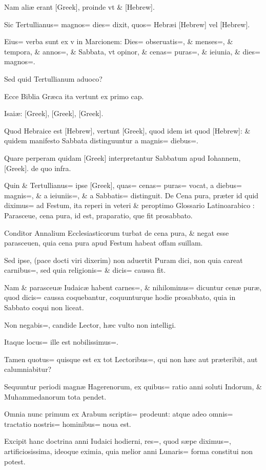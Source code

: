 \begin{parnumbers}
Nam aliæ erant [Greek], proinde vt \& [Hebrew].

Sic Tertullianus= magnos= dies= dixit, quos= Hebræi [Hebrew] vel [Hebrew].

Eius= verba sunt ex v in Marcionem: Dies= obseruatis=, \& menses=, \& tempora, \& annos=, \& Sabbata, vt opinor, \& cenas= puras=, \& ieiunia, \& dies= magnos=. 

Sed quid Tertullianum aduoco?

Ecce Biblia Græca ita vertunt ex primo cap.

Isaiæ: [Greek], [Greek], [Greek].

Quod Hebraice est [Hebrew], vertunt [Greek], quod idem ist quod [Hebrew]: \& quidem manifesto Sabbata distinguuntur a magnis= diebus=. 

Quare perperam quidam [Greek] interpretantur Sabbatum apud Iohannem, [Greek]. de quo infra.

Quin \& Tertullianus= ipse [Greek], quas= cenas= puras= vocat, a diebus= magnis=, \& a ieiuniis=, \& a Sabbatis= distinguit. De Cena pura, præter id quid diximus= ad Festum, ita reperi in veteri \& peroptimo Glossario Latinoarabico : Parasceue, cena pura, id est, praparatio, que fit prosabbato.

Conditor Annalium Ecclesiasticorum turbat de cena pura, \& negat esse parasceuen, quia cena pura apud Festum habeat offam suillam.

Sed ipse, (pace docti viri dixerim) non aduertit Puram dici, non quia careat carnibus=, sed quia religionis= \& dicis= caussa fit.

Nam \& parasceuæ Iudaicæ habent carnes=, \& nihilominus= dicuntur cenæ puræ, quod dicis= caussa coquebantur, coquunturque hodie prosabbato, quia in Sabbato coqui non liceat.

Non negabis=, candide Lector, hæc vulto non intelligi.

Itaque locus= ille est nobilissimus=. 

Tamen quotus= quisque est ex tot Lectoribus=, qui non hæc aut præteribit, aut calumniabitur?

Sequuntur periodi magnæ Hagerenorum, ex quibus= ratio anni soluti Indorum, \& Muhammedanorum tota pendet.

Omnia nunc primum ex Arabum scriptis= prodeunt: atque adeo omnis= tractatio nostris= hominibus= noua est.

Excipit hanc doctrina anni Iudaici hodierni, res=, quod sæpe diximus=, artificiosissima, ideoque eximia, quia melior anni Lunaris= forma constitui non potest.


\end{parnumbers}
